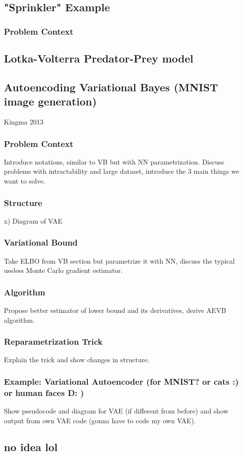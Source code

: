 \documentclass[a4paper,12pt]{article}
\numberwithin{equation}{section}
\begin{document}
\subsection{"Sprinkler" Example}
\subsubsection{Problem Context}

\subsection{Lotka-Volterra Predator-Prey model}
\subsection{Autoencoding Variational Bayes (MNIST image generation)}
Kingma 2013
\subsubsection{Problem Context}
Introduce notations, similar to VB but with NN parametrization. Discuss problems with intractability and large dataset, introduce the 3 main things we want to solve.
\subsubsection{Structure}x)
Diagram of VAE
\subsubsection{Variational Bound}
Take ELBO from VB section but parametrize it with NN, discuss the typical useless Monte Carlo gradient estimator.
\subsubsection{Algorithm}
Propose better estimator of lower bound and its derivatives, derive AEVB algorithm.
\subsubsection{Reparametrization Trick}
Explain the trick and show changes in structure.
\subsubsection{Example: Variational Autoencoder (for MNIST? or cats :) or human faces D: )}
Show pseudocode and diagram for VAE (if different from before) and show output from own VAE code (gonna have to code my own VAE).
\subsection{no idea lol}
\end{document}
